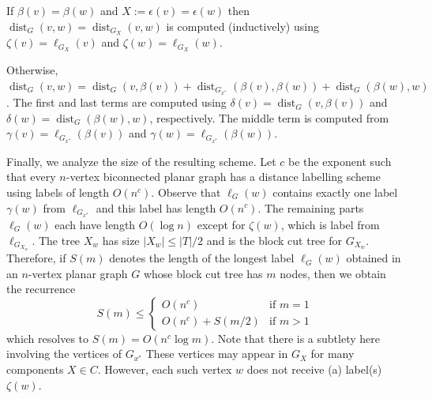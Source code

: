 \documentclass{patmorin}
\DeclareMathOperator{\dist}{dist}
\begin{document}
\begin{compactenum}


    \item If $\beta(v)=\beta(w)$ and $X:=\epsilon(v)=\epsilon(w)$ then  $\dist_G(v,w)=\dist_{G_X}(v,w)$ is computed (inductively) using
     $\zeta(v)=\ell_{G_{X}}(v)$ and $\zeta(w)=\ell_{G_{X}}(w)$.



    \item Otherwise, $\dist_G(v,w)=\dist_{G}(v,\beta(v))+\dist_{G_{x^*}}(\beta(v),\beta(w))+ \dist_{G}(\beta(w),w)$. The first and last terms are computed using $\delta(v)=\dist_G(v,\beta(v))$ and $\delta(w)=\dist_G(\beta(w), w)$, respectively.  The middle term is computed from $\gamma(v)=\ell_{G_{x^*}}(\beta(v))$ and $\gamma(w)=\ell_{G_{x^*}}(\beta(w))$.
\end{compactenum}

Finally, we analyze the size of the resulting scheme.  Let $c$ be the exponent such that every $n$-vertex biconnected planar graph has a distance labelling scheme using labels of length $O(n^c)$.  Observe that $\ell_G(w)$ contains exactly one label $\gamma(w)$ from $\ell_{G_{x^*}}$ and this label has length $O(n^c)$.  The remaining parts $\ell_G(w)$ each have length $O(\log n)$ except for $\zeta(w)$, which is label from $\ell_{G_{X_w}}$.  The tree $X_w$ has size $|X_w|\le |T|/2$ and is the block cut tree for $G_{X_w}$.  Therefore, if $S(m)$ denotes the length of the longest label $\ell_G(w)$ obtained in an $n$-vertex planar graph $G$ whose block cut tree has $m$ nodes, then we obtain the recurrence
\[
  S(m) \le \begin{cases}
               O(n^c) & \text{if $m=1$} \\
               O(n^c) + S(m/2) &  \text{if $m>1$}
           \end{cases}
\]
which resolves to $S(m)=O(n^c\log m)$. Note that there is a subtlety here involving the vertices of $G_{x^*}$ These vertices may appear in $G_X$ for many components $X\in C$.  However, each such vertex $w$ does not receive (a) label(s) $\zeta(w)$.
\end{document}
